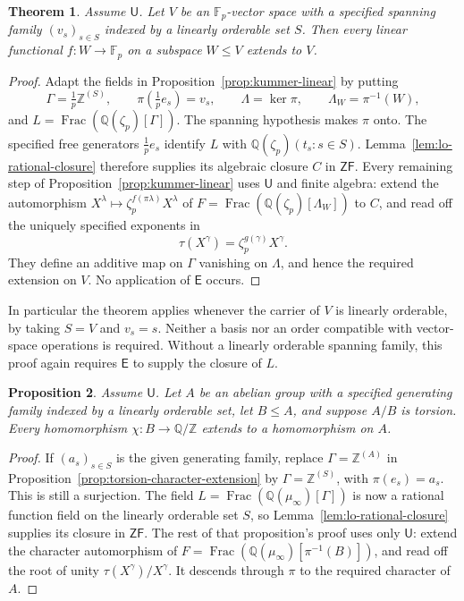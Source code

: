 \documentclass[11pt,a4paper]{article}
\newtheorem{theorem}{Theorem}[section]
\newtheorem{proposition}[theorem]{Proposition}
\theoremstyle{definition}\newtheorem{definition}[theorem]{Definition}
\theoremstyle{remark}\newtheorem{remark}[theorem]{Remark}
\newcommand{\ZF}{\mathsf{ZF}}\newcommand{\ZFA}{\mathsf{ZFA}}
\newcommand{\E}{\mathsf E}\newcommand{\U}{\mathsf U}
\newcommand{\Q}{\mathbb Q}\newcommand{\F}{\mathbb F}
\DeclareMathOperator{\Frac}{Frac}\DeclareMathOperator{\Fix}{Fix}
\begin{document}
\begin{theorem}\label{thm:u-lo-linear}
Assume $\U$.  Let $V$ be an $\F_p$-vector space with a specified spanning
family $(v_s)_{s\in S}$ indexed by a linearly orderable set $S$.
Then every linear functional $f:W\to\F_p$ on a subspace $W\leq V$
extends to $V$.
\end{theorem}
\begin{proof}
Adapt the fields in Proposition~\ref{prop:kummer-linear} by putting
\[
 \Gamma=\tfrac1p\mathbb Z^{(S)},\qquad
 \pi(\tfrac1p e_s)=v_s,\qquad
 \Lambda=\ker\pi,\qquad \Lambda_W=\pi^{-1}(W),
\]
and $L=\Frac(\Q(\zeta_p)[\Gamma])$.
The spanning hypothesis makes $\pi$ onto.
The specified free generators $\tfrac1p e_s$ identify $L$ with
$\Q(\zeta_p)(t_s:s\in S)$.  Lemma~\ref{lem:lo-rational-closure}
therefore supplies its algebraic closure $C$ in $\ZF$.
Every remaining step of Proposition~\ref{prop:kummer-linear} uses $\U$
and finite algebra: extend the automorphism
$X^\lambda\mapsto\zeta_p^{f(\pi\lambda)}X^\lambda$ of
$F=\Frac(\Q(\zeta_p)[\Lambda_W])$ to $C$, and read off the uniquely
specified exponents in
\[
       \tau(X^\gamma)=\zeta_p^{g(\gamma)}X^\gamma.
\]
They define an additive map on $\Gamma$ vanishing on $\Lambda$, and hence
the required extension on $V$.  No application of $\E$ occurs.
\end{proof}

In particular the theorem applies whenever the carrier of $V$ is
linearly orderable, by taking $S=V$ and $v_s=s$.  Neither a basis nor an
order compatible with vector-space operations is required.  Without a
linearly orderable spanning family, this proof again requires $\E$ to
supply the closure of $L$.

\begin{proposition}\label{prop:u-lo-characters}
Assume $\U$.  Let $A$ be an abelian group with a specified generating
family indexed by a linearly orderable set, let $B\leq A$, and suppose
$A/B$ is torsion.  Every homomorphism $\chi:B\to\Q/\mathbb Z$ extends
to a homomorphism on $A$.
\end{proposition}
\begin{proof}
If $(a_s)_{s\in S}$ is the given generating family, replace
$\Gamma=\mathbb Z^{(A)}$ in
Proposition~\ref{prop:torsion-character-extension} by
$\Gamma=\mathbb Z^{(S)}$, with $\pi(e_s)=a_s$.
This is still a surjection.  The field
$L=\Frac(\Q(\mu_\infty)[\Gamma])$ is now a rational function field
on the linearly orderable set $S$, so
Lemma~\ref{lem:lo-rational-closure} supplies its closure in $\ZF$.
The rest of that proposition's proof uses only $\U$: extend the
character automorphism of
$F=\Frac(\Q(\mu_\infty)[\pi^{-1}(B)])$, and read off the root of
unity $\tau(X^\gamma)/X^\gamma$.  It descends through $\pi$ to the
required character of $A$.
\end{proof}
\end{document}
